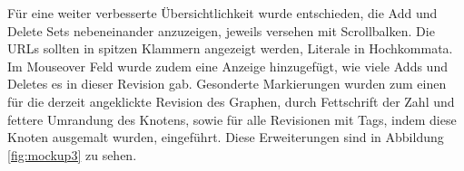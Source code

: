 \documentclass[nocolor]{tudbook}
\begin{document}
Für eine weiter verbesserte Übersichtlichkeit wurde entschieden, die Add und Delete Sets nebeneinander anzuzeigen, jeweils versehen mit Scrollbalken. Die URLs sollten in spitzen Klammern angezeigt werden, Literale in Hochkommata. Im Mouseover Feld wurde zudem eine Anzeige hinzugefügt, wie viele Adds und Deletes es in dieser Revision gab. Gesonderte Markierungen wurden zum einen für die derzeit angeklickte Revision des Graphen, durch Fettschrift der Zahl und fettere Umrandung des Knotens, sowie für alle Revisionen mit Tags, indem diese Knoten ausgemalt wurden, eingeführt. Diese Erweiterungen sind in Abbildung \ref{fig:mockup3} zu sehen.



\listoffigures
\end{document}
